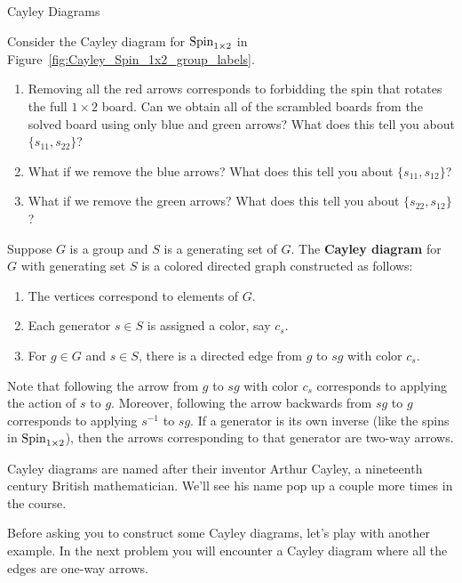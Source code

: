 \begin{section}{Cayley Diagrams}
\begin{problem}\label{cayley:altSpin1x2}
Consider the Cayley diagram for $\operatorname{Spin}_{1\times 2}$ in Figure~\ref{fig:Cayley_Spin_1x2_group_labels}.
\begin{enumerate}[label=\rm{(\alph*)}]
\item Removing all the red arrows corresponds to forbidding the spin that rotates the full $1\times 2$ board. Can we obtain all of the scrambled boards from the solved board using only blue and green arrows? What does this tell you about $\{s_{11},s_{22}\}$?
\item What if we remove the blue arrows? What does this tell you about $\{s_{11},s_{12}\}$?
\item What if we remove the green arrows? What does this tell you about $\{s_{22},s_{12}\}$?
\end{enumerate}
\end{problem}

\begin{definition}
Suppose $G$ is a group and $S$ is a generating set of $G$. The \textbf{Cayley diagram} for $G$ with generating set $S$ is a colored directed graph constructed as follows:
\begin{enumerate}[label=\rm{(\alph*)}]
\item The vertices correspond to elements of $G$.
\item Each generator $s\in S$ is assigned a color, say $c_s$.
\item For $g\in G$ and $s\in S$, there is a directed edge from $g$ to $sg$ with color $c_s$.
\end{enumerate}
\end{definition}

Note that following the arrow from $g$ to $sg$ with color $c_s$ corresponds to applying the action of $s$ to $g$. Moreover, following the arrow backwards from $sg$ to $g$ corresponds to applying $s^{-1}$ to $sg$. If a generator is its own inverse (like the spins in $\operatorname{Spin}_{1\times 2}$), then the arrows corresponding to that generator are two-way arrows.  

Cayley diagrams are named after their inventor Arthur Cayley, a nineteenth century British mathematician.  We'll see his name pop up a couple more times in the course.  

Before asking you to construct some Cayley diagrams, let's play with another example. In the next problem you will encounter a Cayley diagram where all the edges are one-way arrows.


\end{section}
